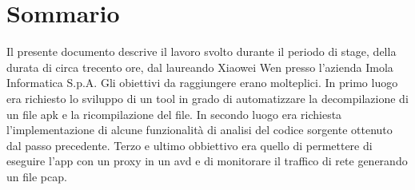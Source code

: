 
\cleardoublepage
{}
{}
\begingroup
\let\clearpage\relax
\let\cleardoublepage\relax
\let\cleardoublepage\relax

\chapter*{Sommario}

Il presente documento descrive il lavoro svolto durante il periodo di stage, della durata di circa trecento ore, dal laureando Xiaowei Wen presso l'azienda Imola Informatica S.p.A. Gli obiettivi da raggiungere erano molteplici. In primo luogo era richiesto lo sviluppo di un tool in grado di automatizzare la decompilazione di un file \gls{apk} e la ricompilazione del file. In secondo luogo era richiesta l'implementazione di alcune funzionalità di analisi del codice sorgente ottenuto dal passo precedente.
Terzo e ultimo obbiettivo era quello di permettere di eseguire l'app con un proxy in un \gls{avd} e di monitorare il traffico di rete generando un file \gls{pcap}.

%
%

\endgroup			

\vfill


